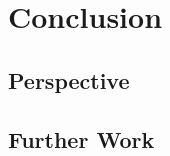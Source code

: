 \chapter{Conclusion}

\section{Perspective}
\label{Perspective}

\section{Further Work}
\label{FurtherWork}